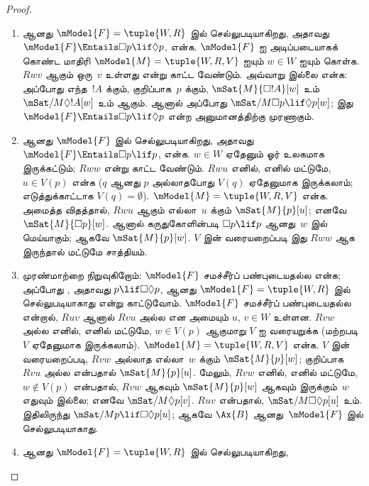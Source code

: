 \documentclass[../../../include/open-logic-section]{subfiles}
\begin{document}
\begin{proof}
  \begin{enumerate}
  \item {} ஆனது $\mModel{F} = \tuple{W, R}$ இல் செல்லுபடியாகிறது,
    அதாவது $\mModel{F} \Entails \Box p \lif \Diamond p$, என்க.
    $\mModel{F}$ ஐ அடிப்படையாகக் கொண்ட மாதிரி $\mModel{M} =
    \tuple{W, R, V}$ ஐயும் $w \in W$ ஐயும் கொள்க. $Rwv$ ஆகும் ஒரு~$v$
    உள்ளது என்று காட்ட வேண்டும். அவ்வாறு இல்லை என்க: அப்போது எந்த~$!A$
    க்கும், குறிப்பாக~$p$ க்கும், $\mSat{M}{\Box !A}[w]$ உம்
    $\mSat/{M}{\Diamond !A}[w]$ உம் ஆகும்.
    ஆனால் அப்போது $\mSat/{M}{\Box p \lif \Diamond p}[w]$; இது
    $\mModel{F} \Entails \Box p \lif \Diamond p$ என்ற அனுமானத்திற்கு
    முரணாகும்.
  \item {} ஆனது $\mModel{F}$ இல் செல்லுபடியாகிறது, அதாவது
    $\mModel{F} \Entails \Box p \lif p$, என்க. $w \in W$ ஏதேனும் ஓர்
    உலகமாக இருக்கட்டும்; $Rww$ என்று காட்ட வேண்டும். $Rwu$ எனில், எனில்
    மட்டுமே, $u \in V(p)$ என்க ($q$ ஆனது $p$ அல்லாதபோது $V(q)$ ஏதேனுமாக
    இருக்கலாம்; எடுத்துக்காட்டாக $V(q) = \emptyset$).
    $\mModel{M} =
    \tuple{W, R, V}$ என்க. அமைத்த விதத்தால், $Rwu$ ஆகும் எல்லா~$u$
    க்கும் $\mSat{M}{p}[u]$; எனவே $\mSat{M}{\Box p}[w]$. ஆனால்
    கருதுகோளின்படி $\Box p \lif p$ ஆனது~$w$ இல் மெய்யாகும்; ஆகவே
    $\mSat{M}{p}[w]$. $V$ இன் வரையறைப்படி இது $Rww$ ஆக இருந்தால் மட்டுமே
    சாத்தியம்.
  \item முரண்மாற்றை நிறுவுகிறோம்: $\mModel{F}$ சமச்சீர்ப் பண்புடையதல்ல
    என்க; அப்போது , அதாவது $p \lif \Box\Diamond p$, ஆனது
    $\mModel{F}= \tuple{W, R}$ இல் செல்லுபடியாகாது என்று காட்டுவோம்.
    $\mModel{F}$ சமச்சீர்ப் பண்புடையதல்ல என்றால், $Ruv$ ஆனால் $Rvu$ அல்ல
    என அமையும் $u$, $v \in W$ உள்ளன. $Rvw$ அல்ல எனில், எனில் மட்டுமே,
    $w \in V(p)$ ஆகுமாறு $V$ ஐ வரையறுக்க (மற்றபடி $V$ ஏதேனுமாக இருக்கலாம்).
    $\mModel{M} =\tuple{W, R, V}$ என்க. $V$ இன் வரையறைப்படி, $Rvw$ அல்லாத
    எல்லா~$w$ க்கும் $\mSat{M}{p}[w]$; குறிப்பாக $Rvu$ அல்ல என்பதால்
    $\mSat{M}{p}[u]$. மேலும், $Rvw$ எனில், எனில் மட்டுமே, $w \notin V(p)$
    என்பதால், $Rvw$ ஆகவும் $\mSat{M}{p}[w]$ ஆகவும் இருக்கும்~$w$ எதுவும்
    இல்லை; எனவே $\mSat/{M}{\Diamond p}[v]$. $Ruv$ என்பதால்,
    $\mSat/{M}{\Box\Diamond p}[u]$ உம். இதிலிருந்து $\mSat/{M}{p \lif
      \Box\Diamond p}[u]$; ஆகவே $\Ax{B}$ ஆனது~$\mModel{F}$ இல்
    செல்லுபடியாகாது.
  \item {} ஆனது $\mModel{F} = \tuple{W,R}$ இல் செல்லுபடியாகிறது,

\end{enumerate}
\end{proof}
\end{document}
